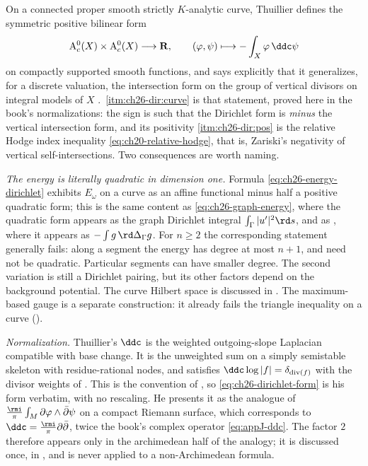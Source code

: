 \begin{remark}[Thuillier's Dirichlet form, and what $n=1$ buys]
\label{rem:ch26-thuillier-dirichlet}
On a connected proper smooth strictly $K$-analytic curve, Thuillier defines
the symmetric positive bilinear form
\[
 \mathrm A^0_c(X)\times \mathrm A^0_c(X)\longrightarrow\mathbf R,
 \qquad
 (\varphi,\psi)\longmapsto-\int_X\varphi\,\ddc\psi
\]
on compactly supported smooth functions, and says explicitly that it
generalizes, for a discrete valuation, the intersection form on the group of
vertical divisors on integral models of $X$ \cite[\S3.5]{Thu05}.
\,\cref{itm:ch26-dir:curve} is that
statement, proved here in the book's normalizations: the sign is such that
the Dirichlet form is \emph{minus} the vertical intersection form, and its
positivity \cref{itm:ch26-dir:pos} is the relative Hodge index inequality
\eqref{eq:ch20-relative-hodge}, that is, Zariski's negativity of vertical
self-intersections.  Two consequences are worth naming.

\emph{The energy is literally quadratic in dimension one.}
Formula \eqref{eq:ch26-energy-dirichlet} exhibits $E_\omega$ on a curve as
an affine functional minus half a positive quadratic form; this is the same
content as \eqref{eq:ch26-graph-energy}, where the quadratic form appears as
the graph Dirichlet integral $\int_\Gamma|u'|^2\rd s$, and as
, where it appears as
$-\int g\,\rd\Delta_\Gamma g$.  For $n\geq2$ the corresponding statement
generally fails: along a segment the energy has degree at most $n+1$,
and need not be quadratic.  Particular segments can have smaller degree.
The second variation is still a Dirichlet pairing, but its other factors
depend on the background potential.  The curve Hilbert space is discussed
in .  The maximum-based gauge is a separate
construction: it already fails the triangle inequality on a curve
().

\emph{Normalization.}  Thuillier's $\ddc$ is the weighted outgoing-slope
Laplacian compatible with base change.  It is the unweighted sum on a
simply semistable skeleton with residue-rational nodes, and satisfies
$\ddc\log|f|=\delta_{\operatorname{div}(f)}$ with the divisor weights of
.  This is the convention of
, so
\eqref{eq:ch26-dirichlet-form} is his form verbatim, with no rescaling.  He
presents it as the analogue of
$\frac{\rmi}{\pi}\int_M\partial\varphi\wedge\bar\partial\psi$ on a compact
Riemann surface, which corresponds to
$\ddc=\frac{\rmi}{\pi}\partial\bar\partial$, twice the book's complex
operator \eqref{eq:appJ-ddc}.  The factor $2$ therefore appears only in
the archimedean half of the analogy; it is discussed once, in
, and is never applied to a
non-Archimedean formula.
\end{remark}

